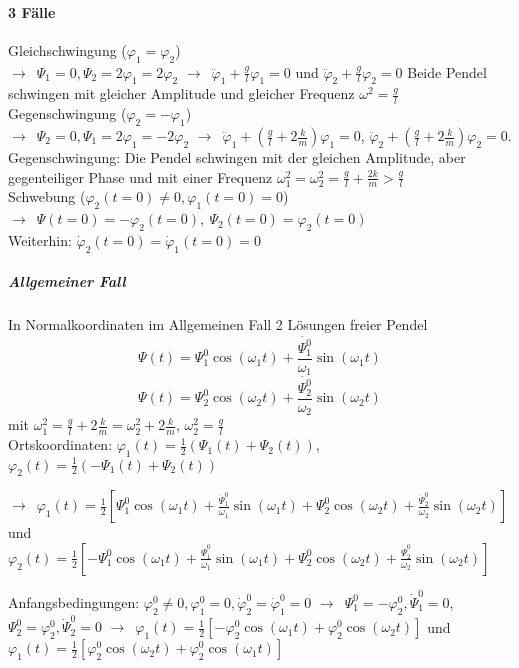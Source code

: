 \documentclass[oneside]{book}
\theoremstyle{definition}
\newcommand{\conseq}{$\rightarrow$~}
\newcommand{\vp}{\varphi}
\newcommand{\dvp}{\dot{\vp}}
\newcommand{\ddvp}{\ddot{\vp}}
\begin{document}
\paragraph{3 Fälle}
Gleichschwingung ($\vp_1 = \vp_2$)\\
\conseq $\Psi_1 = 0, \Psi_2 = 2 \vp_1 = 2 \vp_2$ \conseq $\ddvp_1 + \frac{g}{l} \vp_1 = 0$ und $\ddvp_2 + \frac{g}{l} \vp_2 = 0$ Beide Pendel schwingen mit gleicher Amplitude und gleicher Frequenz $\omega^2 = \frac{g}{l}$\\
Gegenschwingung ($\vp_2 = -\vp_1$)\\
\conseq $\Psi_2 = 0, \Psi_1 = 2 \vp_1 = - 2 \vp_2$ \conseq $\ddvp_1 + (\frac{g}{l} + 2 \frac{k}{m}) \vp_1 = 0$, $\ddvp_2 + (\frac{g}{l} + 2 \frac{k}{m}) \vp_2 = 0$. Gegenschwingung: Die Pendel schwingen mit der gleichen Amplitude, aber gegenteiliger Phase und mit einer Frequenz $\omega_1^2 = \omega_2^2 = \frac{g}{l} + \frac{2k}{m} > \frac{g}{l}$\\
Schwebung ($\vp_2(t = 0) \neq 0, \vp_1(t=0) = 0$)\\
\conseq $\Psi(t = 0) = - \vp_2(t=0), ~\Psi_2(t=0) = \vp_2(t=0)$\\
Weiterhin: $\dvp_2(t=0) = \dvp_1(t = 0) = 0$
\subparagraph{Allgemeiner Fall}
In Normalkoordinaten im Allgemeinen Fall 2 Lösungen freier Pendel
$$\Psi(t) = \Psi_1^0 \cos(\omega_1 t) + \frac{\dot{\Psi_1^0}}{\omega_1} \sin(\omega_1 t)$$
$$\Psi(t) = \Psi_2^0 \cos(\omega_2 t) + \frac{\dot{\Psi_2^0}}{\omega_2} \sin(\omega_2 t)$$
mit $\omega_1^2 = \frac{g}{l} + 2 \frac{k}{m} = \omega_2^2 + 2 \frac{k}{m}$, $\omega_2^2 = \frac{g}{l}$\\
Ortskoordinaten: $\vp_1(t) = \frac{1}{2} (\Psi_1(t) + \Psi_2(t))$, $\vp_2(t) = \frac{1}{2} (-\Psi_1(t) + \Psi_2(t))$


\conseq $\vp_1(t) = \frac12 [\Psi_1^0 \cos(\omega_1 t) + \frac{\dot{\Psi}_1^0}{\omega_1} \sin(\omega_1 t) + \Psi_2^0 \cos(\omega_2 t) + \frac{\dot{\Psi}_2^0}{\omega_2} \sin(\omega_2 t)]$ und
$\vp_2(t) = \frac12 [- \Psi_1^0 \cos(\omega_1 t) + \frac{\dot{\Psi}_1^0}{\omega_1} \sin(\omega_1 t) + \Psi_2^0 \cos(\omega_2 t) + \frac{\dot{\Psi}_2^0}{\omega_2} \sin(\omega_2 t)]$

Anfangsbedingungen: $\vp_2^0 \neq 0, \vp_1^0 = 0, \dvp_2^0 = \dvp_1^0 = 0$ \conseq $\Psi_1^0 = - \vp_2^0, \dot{\Psi}_1^0 = 0$, $\Psi_2^0 = \vp_2^0, \dot{\Psi}_2^0 = 0$
\conseq $\vp_1(t) = \frac12 [- \vp_2^0 \cos(\omega_1 t) + \vp_2^0 \cos(\omega_2 t)]$ und $\vp_1(t) = \frac12 [\vp_2^0 \cos(\omega_2 t) + \vp_2^0 \cos(\omega_1 t)]$
\end{document}
